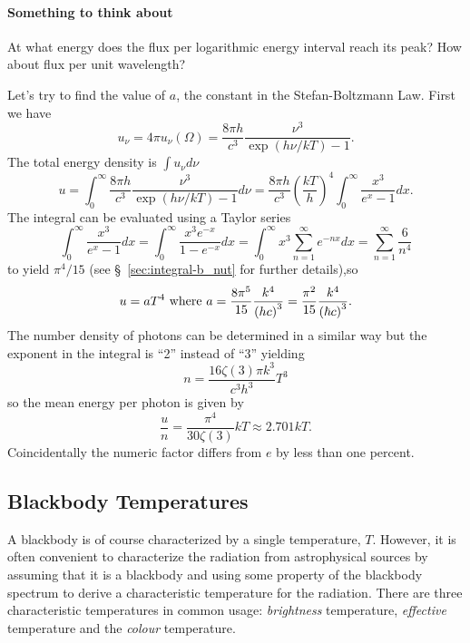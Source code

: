 \paragraph{Something to think about}  At what energy does the flux per
logarithmic energy interval reach its peak? How about flux per unit wavelength?

Let's try to find the value of $a$, the constant in the
Stefan-Boltzmann Law.  First we have 
\begin{equation}
u_\nu = 4 \pi u_\nu(\Omega) = \frac{8 \pi h}{c^3} \frac{\nu^3}{\exp ( h \nu / k T) - 1}.
\label{eq:43}
\end{equation}
The total energy density is $\int u_\nu d\nu$
\begin{equation}
u = \int_0^\infty \frac{8 \pi h}{c^3} \frac{\nu^3}{\exp ( h \nu / k T)
- 1} d \nu = \frac{8 \pi h}{c^3} \left ( \frac{kT}{h} \right )^4 
\int_0^\infty \frac{x^3}{e^x - 1} d x.
\label{eq:44}
\end{equation}
The integral can be evaluated using a Taylor series
\begin{equation}
\int_0^\infty \frac{x^3}{e^x - 1} d x
= \int_0^\infty \frac{x^3 e^{-x}}{1-e^{-x}} d x =
\int_0^\infty x^3 \sum_{n=1}^{\infty} e^{-nx} d x = \sum_{n=1}^\infty \frac{6}{n^4}
\label{eq:45}
\end{equation} 
to yield $\pi^4/15$ (see \S~\ref{sec:integral-b_nut} for further details),so
\begin{equation}
  u = a T^4~\hbox{\rm where}~a = \frac{8\pi^5}{15} \frac{k^4}{\left (h c \right)^3} =
  \frac{\pi^2}{15} \frac{k^4}{\left (\hbar c\right)^3}.
\label{eq:792}
\end{equation}
The number density of photons can be determined in a similar way but
the exponent in the integral is ``2'' instead of ``3'' yielding
\begin{equation}
n = \frac{16 \zeta(3) \pi k^3}{c^3 h^3} T^3
\end{equation}
so the mean energy per photon is given by
\begin{equation}
\frac{u}{n} = \frac{\pi^4}{30 \zeta(3)} k T \approx 2.701 k T.
\end{equation}
Coincidentally the numeric factor differs from $e$ by less than one
percent.

\subsection{Blackbody Temperatures}
\label{sec:blackb-temp}
A blackbody is of course characterized by a single temperature, $T$.
However, it is often convenient to characterize the radiation from
astrophysical sources by assuming that it is a blackbody and using
some property of the blackbody spectrum to derive a characteristic
temperature for the radiation.   There are three characteristic
temperatures in common usage: {\it brightness}
temperature,
{\it effective} temperature and the {\it colour} temperature.

